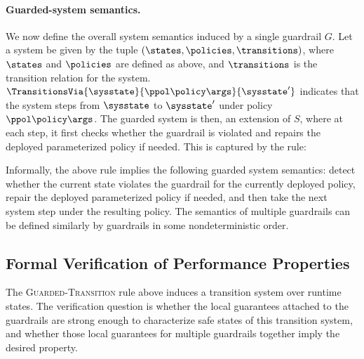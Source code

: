 \paragraph{Guarded-system semantics.}
We now define the overall system semantics induced by a single guardrail $G$.
Let a system be given by the tuple $(\states,\policies,\transitions)$, where $\states$ and $\policies$ are defined as above, and $\transitions$ is the transition relation for the system. $\TransitionsVia{\sysstate}{\ppol\policy\args}{\sysstate'}$ indicates that the system steps from $\sysstate$ to $\sysstate'$ under policy $\ppol\policy\args$.
The guarded system is then, an extension of $S$, where at each step, it first checks whether the guardrail is violated and repairs the deployed parameterized policy if needed.
This is captured by the rule:
\begin{mathpar}
\end{mathpar}
Informally, the above rule implies the following guarded system semantics: detect whether the current state violates the guardrail for the currently deployed policy, repair the deployed parameterized policy if needed, and then take the next system step under the resulting policy.  The semantics of multiple guardrails can be defined similarly by guardrails in some nondeterministic order.


\subsection{Formal Verification of Performance Properties}
\label{subsec:verification-conditions}

The \textsc{Guarded-Transition} rule above induces a transition system over runtime states.
The verification question is whether the local guarantees attached to the guardrails are strong enough to characterize safe states of this transition system, and whether those local guarantees for multiple guardrails together imply the desired \perfsafety property.

